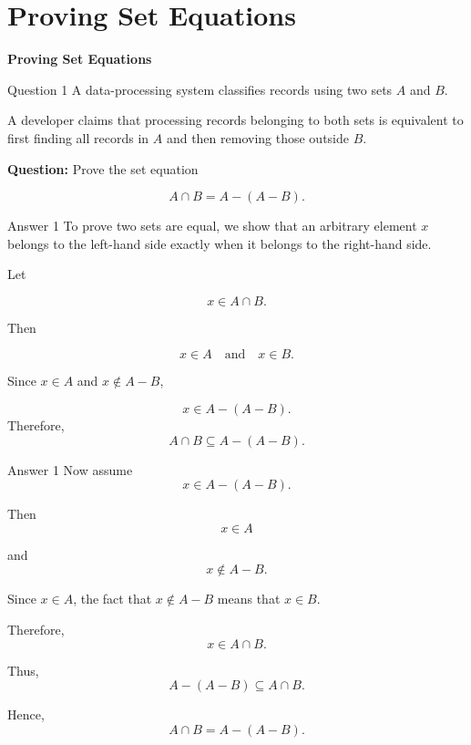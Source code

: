 \section{Proving Set Equations}

\begin{frame}
\centering
\Huge\textbf{Proving Set Equations}
\end{frame}


\begin{frame}{Question 1}
A data-processing system classifies records using two sets $A$ and $B$.

A developer claims that processing records belonging to both sets is equivalent to first finding all records in $A$ and then removing those outside $B$.

\textbf{Question:} Prove the set equation

$$
A\cap B=A-(A-B).
$$

\end{frame}

\begin{frame}{Answer 1}
To prove two sets are equal, we show that an arbitrary element $x$ belongs to the left-hand side exactly when it belongs to the right-hand side.

Let

$$
x\in A\cap B.
$$

Then

$$
x\in A
\quad\text{and}\quad
x\in B.
$$

Since $x\in A$ and $x\notin A-B$,

$$
x\in A-(A-B).
$$
Therefore,
$$
A\cap B\subseteq A-(A-B).
$$

\end{frame}

\begin{frame}{Answer 1}
Now assume
$$
x\in A-(A-B).
$$

Then
$$
x\in A
$$

and
$$
x\notin A-B.
$$

Since $x\in A$, the fact that $x\notin A-B$ means that $x\in B$.

Therefore,
$$
x\in A\cap B.
$$

Thus,
$$
A-(A-B)\subseteq A\cap B.
$$

Hence,
$$
\boxed{A\cap B=A-(A-B)}.
$$

\end{frame}

